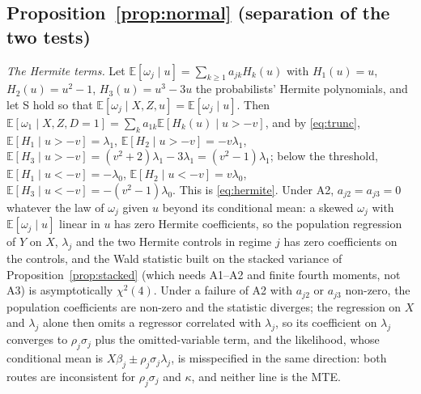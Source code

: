 \documentclass[11pt,a4paper]{article}
\theoremstyle{plain}
\theoremstyle{definition}
\theoremstyle{remark}
\newcommand{\E}{\mathbb{E}}
\newcommand{\1}{\mathbf{1}}
\begin{document}
\subsection{Proposition~\ref{prop:normal} (separation of the two tests)}

\emph{The Hermite terms.} Let $\E[\omega_j\mid u]=\sum_{k\ge1}a_{jk}H_k(u)$
with $H_1(u)=u$, $H_2(u)=u^2-1$, $H_3(u)=u^3-3u$ the probabilists'
Hermite polynomials, and let S hold so that $\E[\omega_j\mid X,Z,u]=\E[\omega_j\mid u]$.
Then $\E[\omega_1\mid X,Z,D=1]=\sum_k a_{1k}\E[H_k(u)\mid u>-v]$, and by
\eqref{eq:trunc}, $\E[H_1\mid u>-v]=\lambda_1$,
$\E[H_2\mid u>-v]=-v\lambda_1$,
$\E[H_3\mid u>-v]=(v^2+2)\lambda_1-3\lambda_1=(v^2-1)\lambda_1$; below the
threshold, $\E[H_1\mid u<-v]=-\lambda_0$, $\E[H_2\mid u<-v]=v\lambda_0$,
$\E[H_3\mid u<-v]=-(v^2-1)\lambda_0$. This is \eqref{eq:hermite}. Under
A2, $a_{j2}=a_{j3}=0$ whatever the law of $\omega_j$ given $u$ beyond
its conditional mean: a skewed $\omega_j$ with $\E[\omega_j\mid u]$ linear
in $u$ has zero Hermite coefficients, so the population regression of $Y$
on $X$, $\lambda_j$ and the two Hermite controls in regime $j$ has zero
coefficients on the controls, and the Wald statistic built on the stacked
variance of Proposition~\ref{prop:stacked} (which needs A1--A2 and
finite fourth moments, not A3) is asymptotically $\chi^2(4)$. Under a
failure of A2 with $a_{j2}$ or $a_{j3}$ non-zero, the population
coefficients are non-zero and the statistic diverges; the regression on
$X$ and $\lambda_j$ alone then omits a regressor correlated with
$\lambda_j$, so its coefficient on $\lambda_j$ converges to
$\rho_j\sigma_j$ plus the omitted-variable term, and the likelihood, whose
conditional mean is $X\beta_j\pm\rho_j\sigma_j\lambda_j$, is misspecified
in the same direction: both routes are inconsistent for
$\rho_j\sigma_j$ and $\kappa$, and neither line is the MTE.
\end{document}
